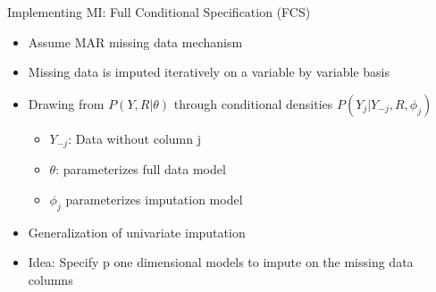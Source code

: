 \begin{frame}{Implementing MI: Full Conditional Specification (FCS)}
 \begin{itemize}
  \item Assume MAR missing data mechanism %
  \item Missing data is imputed iteratively on a variable by variable basis
\item Drawing from $P(Y,R|\theta)$ through conditional densities $P(Y_j|Y_{-j},R,\phi_j)$
  \begin{itemize}
   \item $Y_{-j}$: Data without column j
   \item $\theta$: parameterizes full data model
\item $\phi_j$ parameterizes imputation model
  \end{itemize}

  \item Generalization of univariate imputation
  \item Idea: Specify p one dimensional models to impute on the missing data columns
 \end{itemize}

\end{frame}

